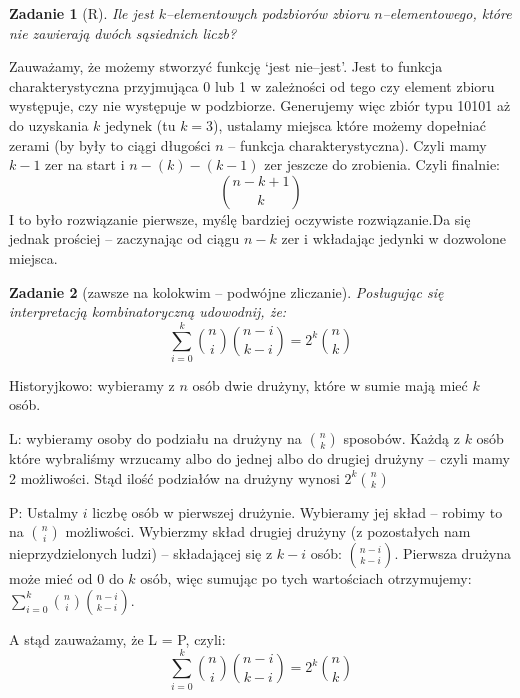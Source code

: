 \documentclass{mwbk}
\newtheorem{zad}{Zadanie}[chapter]
\begin{document}
\begin{zad}[R]
    Ile jest $k$--elementowych podzbiorów zbioru $n$--elementowego, które nie
    zawierają dwóch sąsiednich liczb?
\end{zad}
\begin{mdframed}
    Zauważamy, że możemy stworzyć funkcję `jest nie--jest'. Jest to funkcja charakterystyczna
    przyjmująca 0 lub 1 w zależności od tego czy element zbioru występuje, czy nie występuje w podzbiorze.
    Generujemy więc zbiór typu 10101 aż do uzyskania $k$ jedynek (tu $k=3$), ustalamy miejsca które możemy dopełniać zerami (by były to ciągi długości $n$ -- funkcja
    charakterystyczna). Czyli mamy $k-1$ zer na start i $n-(k)-(k-1)$ zer jeszcze do zrobienia.
    Czyli finalnie:
    \[\binom{n-k+1}{k}  \]
    I to było rozwiązanie pierwsze, myślę bardziej oczywiste rozwiązanie.Da się jednak prościej -- zaczynając od ciągu $n-k$ zer i wkładając jedynki w dozwolone miejsca.
\end{mdframed}


\begin{zad}[zawsze na kolokwim -- podwójne zliczanie]
    Posługując się interpretacją kombinatoryczną udowodnij, że:
    \[ \sum_{i=0}^{k} \binom{n}{i} \binom{n-i}{k-i} = 2^k \binom{n}{k} \]
\end{zad}
\begin{mdframed}
    Historyjkowo: wybieramy z $n$ osób dwie drużyny, które w sumie mają mieć $k$ osób.

    L: wybieramy osoby do podziału na drużyny na $\binom{n}{k}$ sposobów.
    Każdą z $k$ osób które wybraliśmy wrzucamy albo do jednej albo do drugiej drużyny
    -- czyli mamy 2 możliwości. Stąd ilość podziałów na drużyny wynosi $2^k \binom{n}{k}$

    P: Ustalmy $i$ liczbę osób w pierwszej drużynie. Wybieramy jej skład -- robimy
    to na $\binom{n}{i}$ możliwości. Wybierzmy skład drugiej drużyny
    (z pozostałych nam nieprzydzielonych ludzi)
    -- składającej się z $k-i$ osób: $\binom{n-i}{k-i}$.
    Pierwsza drużyna może mieć od $0$ do $k$ osób, więc sumując po tych wartościach
    otrzymujemy: $\sum_{i=0}^{k} \binom{n}{i} \binom{n-i}{k-i}$.

    A stąd zauważamy, że L = P, czyli:
    \[ \sum_{i=0}^{k} \binom{n}{i} \binom{n-i}{k-i} = 2^k \binom{n}{k} \]


\end{mdframed}
\end{document}
